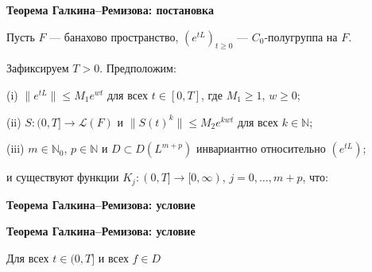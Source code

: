 \documentclass[11pt]{article}
\newcommand{\N}{\mathbb{N}}
\begin{document}
\newpage

\begin{center}
{\color{notaeYELLOW}\bfseries\fontsize{44}{52}\selectfont Теорема Галкина--Ремизова: постановка}
\end{center}
\vspace*{\fill}
\begin{center}
\fontsize{36}{43}\selectfont
\parbox{\linewidth}{\centering\noindent Пусть $F$ --- банахово пространство, $(e^{tL})_{t\ge0}$ --- $C_0$-полугруппа на $F$.
\par}\vspace{0.4in}
\parbox{\linewidth}{\centering\noindent Зафиксируем $T>0$. Предположим:
\par}\vspace{0.4in}
\parbox{\linewidth}{\centering\noindent (i) $\|e^{tL}\|\le M_1e^{wt}$ для всех $t\in[0,T]$, где $M_1\ge1$, $w\ge0$;
\par}\vspace{0.4in}
\parbox{\linewidth}{\centering\noindent (ii) $S:(0,T]\to\mathcal{L}(F)$ и $\|S(t)^k\|\le M_2e^{kwt}$ для всех $k\in\N$;
\par}\vspace{0.4in}
\parbox{\linewidth}{\centering\noindent (iii) $m\in\N_0$, $p\in\N$ и $D\subset D(L^{m+p})$ инвариантно относительно $(e^{tL})$;
\par}\vspace{0.4in}
\parbox{\linewidth}{\centering\noindent и существуют функции $K_j:(0,T]\to[0,\infty)$, $j=0,\dots,m+p$, что:
\par}\vspace{0.4in}
\end{center}
\vspace*{\fill}

\newpage

\begin{center}
{\color{notaeYELLOW}\bfseries\fontsize{44}{52}\selectfont Теорема Галкина--Ремизова: условие}
\end{center}
\vspace*{\fill}
\begin{center}
\fontsize{36}{43}\selectfont
\end{center}
\vspace*{\fill}

\newpage

\begin{center}
{\color{notaeYELLOW}\bfseries\fontsize{44}{52}\selectfont Теорема Галкина--Ремизова: условие}
\end{center}
\vspace*{\fill}
\begin{center}
\fontsize{36}{43}\selectfont
\parbox{\linewidth}{\centering\noindent Для всех $t\in(0,T]$ и всех $f\in D$
\par}\vspace{0.4in}
\end{center}
\vspace*{\fill}
\end{document}
